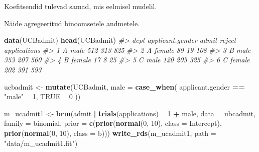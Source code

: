 \documentclass[]{book}
\newenvironment{Shaded}{\begin{snugshade}}{\end{snugshade}}
\newcommand{\CommentTok}[1]{\textcolor[rgb]{0.56,0.35,0.01}{\textit{#1}}}
\newcommand{\DataTypeTok}[1]{\textcolor[rgb]{0.13,0.29,0.53}{#1}}
\newcommand{\DecValTok}[1]{\textcolor[rgb]{0.00,0.00,0.81}{#1}}
\newcommand{\KeywordTok}[1]{\textcolor[rgb]{0.13,0.29,0.53}{\textbf{#1}}}
\newcommand{\NormalTok}[1]{#1}
\newcommand{\OperatorTok}[1]{\textcolor[rgb]{0.81,0.36,0.00}{\textbf{#1}}}
\newcommand{\OtherTok}[1]{\textcolor[rgb]{0.56,0.35,0.01}{#1}}
\newcommand{\StringTok}[1]{\textcolor[rgb]{0.31,0.60,0.02}{#1}}
\begin{document}
Koefitsendid tulevad samad, mis eelmisel mudelil.

Näide agregeeritud binoomsetele andmetele.

\begin{Shaded}
\begin{Highlighting}[]
\KeywordTok{data}\NormalTok{(UCBadmit)}
\KeywordTok{head}\NormalTok{(UCBadmit)}
\CommentTok{#>   dept applicant.gender admit reject applications}
\CommentTok{#> 1    A             male   512    313          825}
\CommentTok{#> 2    A           female    89     19          108}
\CommentTok{#> 3    B             male   353    207          560}
\CommentTok{#> 4    B           female    17      8           25}
\CommentTok{#> 5    C             male   120    205          325}
\CommentTok{#> 6    C           female   202    391          593}
\end{Highlighting}
\end{Shaded}

\begin{Shaded}
\begin{Highlighting}[]
\NormalTok{ucbadmit <-}\StringTok{ }\KeywordTok{mutate}\NormalTok{(UCBadmit, }\DataTypeTok{male =} \KeywordTok{case_when}\NormalTok{(}
\NormalTok{  applicant.gender }\OperatorTok{==}\StringTok{ "male"} \OperatorTok{~}\StringTok{ }\DecValTok{1}\NormalTok{,}
  \OtherTok{TRUE} \OperatorTok{~}\StringTok{ }\DecValTok{0}
\NormalTok{))}
\end{Highlighting}
\end{Shaded}

\begin{Shaded}
\begin{Highlighting}[]
\NormalTok{m_ucadmit1 <-}\StringTok{ }\KeywordTok{brm}\NormalTok{(admit }\OperatorTok{|}\StringTok{ }\KeywordTok{trials}\NormalTok{(applications) }\OperatorTok{~}\StringTok{ }\DecValTok{1} \OperatorTok{+}\StringTok{ }\NormalTok{male,}
                  \DataTypeTok{data =}\NormalTok{ ubcadmit, }
                  \DataTypeTok{family =}\NormalTok{ binomial,}
                  \DataTypeTok{prior =} \KeywordTok{c}\NormalTok{(}\KeywordTok{prior}\NormalTok{(}\KeywordTok{normal}\NormalTok{(}\DecValTok{0}\NormalTok{, }\DecValTok{10}\NormalTok{), }\DataTypeTok{class =}\NormalTok{ Intercept), }
                            \KeywordTok{prior}\NormalTok{(}\KeywordTok{normal}\NormalTok{(}\DecValTok{0}\NormalTok{, }\DecValTok{10}\NormalTok{), }\DataTypeTok{class =}\NormalTok{ b)))}
\KeywordTok{write_rds}\NormalTok{(m_ucadmit1, }\DataTypeTok{path =} \StringTok{"data/m_ucadmit1.fit"}\NormalTok{)}
\end{Highlighting}
\end{Shaded}
\end{document}
